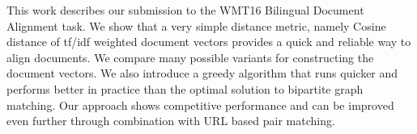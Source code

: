 This work describes our submission to the WMT16 Bilingual Document Alignment task. We show that a very simple distance metric, namely Cosine distance of tf/idf weighted document vectors provides a quick and reliable way to align documents. We compare many possible variants for constructing the document vectors. We also introduce a greedy algorithm that runs quicker and performs better in practice than the optimal solution to bipartite graph matching. Our approach shows competitive performance and can be improved even further through combination with URL based pair matching.
